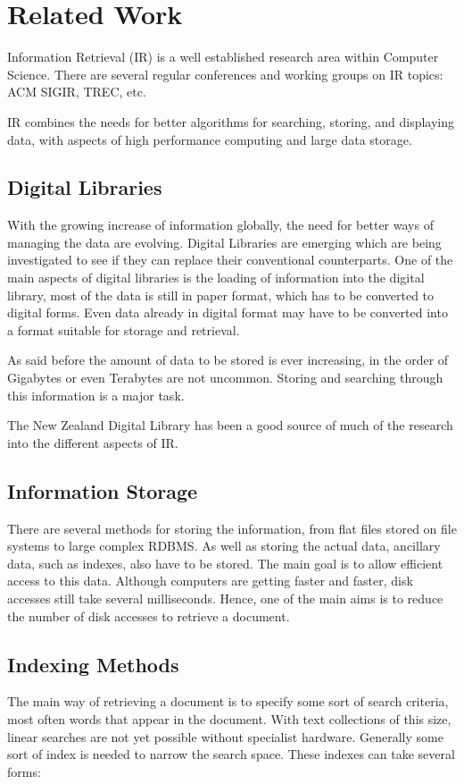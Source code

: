 
\chapter{Related Work}

Information Retrieval (IR) is a well established research area within
Computer Science.  There are several regular conferences and working
groups on IR topics: ACM SIGIR, TREC, etc.

IR combines the needs for better algorithms for searching, storing, and
displaying data, with aspects of high performance computing and large data
storage.  

\section{Digital Libraries} 
With the growing increase of information globally, the need for better
ways of managing the data are evolving.  Digital Libraries are emerging
which are being investigated to see if they can replace their conventional
counterparts.  One of the main aspects of digital libraries is the loading
of information into the digital library, most of the data is still in
paper format, which has to be converted to digital forms.  Even data
already in digital format may have to be converted into a format suitable
for storage and retrieval.

As said before the amount of data to be stored is ever increasing, in the
order of Gigabytes or even Terabytes are not uncommon.  Storing and
searching through this information is a major task.

The New Zealand Digital Library \cite{www:nzdl} has been a good source of much of the research into the different aspects of IR.

\section{Information Storage}
There are several methods for storing the information, from flat files
stored on file systems to large complex RDBMS.  As well as storing the
actual data, ancillary data, such as indexes, also have to be stored.
The main goal is to allow efficient access to this data.  Although
computers are getting faster and faster, disk accesses still take several
milliseconds.  Hence, one of the main aims is to reduce the number of disk
accesses to retrieve a document.

\section{Indexing Methods}
The main way of retrieving a document is to specify some sort of search
criteria, most often words that appear in the document.  With text
collections of this size, linear searches are not yet possible without
specialist hardware.  Generally some sort of index is needed to narrow the
search space.  These indexes can take several forms:

